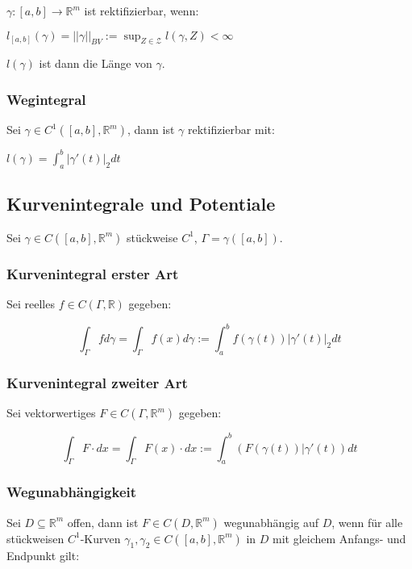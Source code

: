 $\gamma : [a, b] \rightarrow \mathbb{R}^m$ ist rektifizierbar, wenn:

$l_{[a, b]}(\gamma) = ||\gamma||_{BV} := \sup_{Z\in \mathcal{Z}} l(\gamma, Z) < \infty$

$l(\gamma)$ ist dann die Länge von $\gamma$.

\subsubsection*{Wegintegral}

Sei $\gamma \in C^1([a, b], \mathbb{R}^m)$, dann ist $\gamma$ rektifizierbar mit:

$l(\gamma) = \int_a^b |\gamma'(t)|_2 dt$

\subsection*{Kurvenintegrale und Potentiale}

Sei $\gamma \in C([a, b], \mathbb{R}^m)$ stückweise $C^1$, $\Gamma = \gamma([a, b])$.

\subsubsection*{Kurvenintegral erster Art}

Sei reelles $f \in C(\Gamma, \mathbb{R})$ gegeben:

\vspace*{-5mm}
$$\int_\Gamma f d\gamma = \int_\Gamma f(x) d\gamma := \int_a^b f(\gamma(t)) | \gamma'(t) |_2 dt$$

\subsubsection*{Kurvenintegral zweiter Art}

Sei vektorwertiges $F \in C(\Gamma, \mathbb{R}^m)$ gegeben:

\vspace*{-5mm}
$$\int_\Gamma F \cdot dx = \int_\Gamma F(x) \cdot dx := \int_a^b (F(\gamma(t))|\gamma'(t)) dt$$

\subsubsection*{Wegunabhängigkeit}

Sei $D \subseteq \mathbb{R}^m$ offen, dann ist $F \in C(D, \mathbb{R}^m)$ wegunabhängig auf $D$, wenn für alle stückweisen $C^1$-Kurven $\gamma_1, \gamma_2 \in C([a, b], \mathbb{R}^m)$ in $D$ mit gleichem Anfangs- und Endpunkt gilt:

